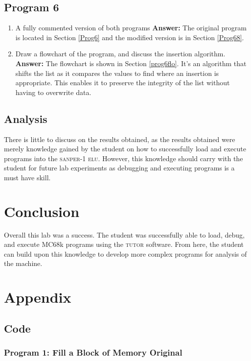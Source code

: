 \documentclass[12pt, twocolumn]{article}
\begin{document}
\subsection{Program 6}
\begin{enumerate}
	\item A fully commented version of both programs
	\subitem \hspace{-0.7cm}\textbf{Answer:} The original program is located in Section \ref{Prog6} and the modified version is in Section \ref{Prog68}.
	\item Draw a flowchart of the program, and discuss the insertion algorithm.
	\subitem \hspace{-0.7cm}\textbf{Answer:} The flowchart is shown in Section \ref{prog6flo}. It's an algorithm that shifts the list as it compares the values to find where an insertion is appropriate. This enables it to preserve the integrity of the list without having to overwrite data.
\end{enumerate}
\subsection{Analysis}
There is little to discuss on the results obtained, as the results obtained were merely knowledge gained by the student on how to successfully load and execute programs into the \textsc{sanper-1 elu}. However, this knowledge should carry with the student for future lab experiments as debugging and executing programs is a must have skill.
\onecolumn
\section{Conclusion} 
Overall this lab was a success. The student was successfully able to load, debug, and execute MC68k programs using the \textsc{tutor} software. From here, the student can build upon this knowledge to develop more complex programs for analysis of the machine.
\section{Appendix}
\label{appendix}
\subsection{Code}
\lstset{language=[Motorola68k]Assembler}
\subsubsection{Program 1: \normalfont Fill a Block of Memory Original}\label{Prog1or}

\end{document}
